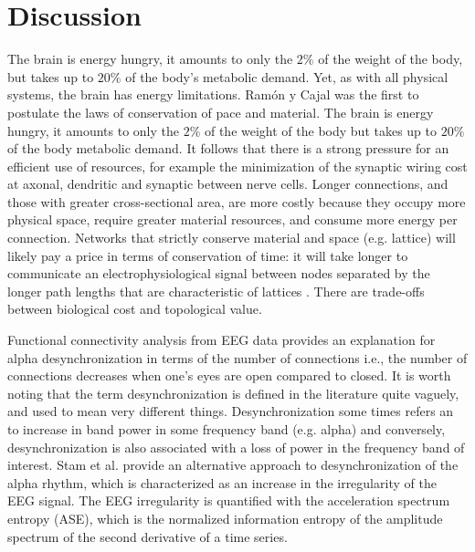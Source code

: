 \documentclass[11pt, onecolumn]{article}
\begin{document}
{\section{Discussion}

The  brain  is energy  hungry,  it  amounts  to  only the  $2\%$ of the  weight  of the  body,  but  takes  up  to  $20\%$ of the  body's  metabolic demand. Yet, as with all physical systems, the brain has energy limitations. Ram{\'o}n y Cajal was the first to postulate the laws of conservation of pace and material. The brain is energy hungry, it amounts to only the $2\%$ of the weight of the body but takes up to $20\%$ of the body metabolic demand. It follows that there is a strong pressure for an efficient use of resources, for example the minimization of the synaptic wiring cost at axonal, dendritic and synaptic between nerve cells.
Longer connections, and those with greater cross-sectional area, are more costly because they occupy more physical space, require greater material resources, and consume more energy per connection. Networks that strictly conserve material and space (e.g. lattice) will likely pay a price in terms of conservation of time: it will take longer to communicate an electrophysiological signal between nodes separated by the longer path lengths that are characteristic of lattices \citep{fornito2016fundamentals}. There are trade-offs between biological cost and topological value.

Functional connectivity analysis from EEG data provides an explanation for alpha desynchronization in terms of the number of connections i.e.,  the number of connections decreases when one's eyes are open compared to closed. It is worth noting that the term desynchronization is defined in the literature quite vaguely, and used to mean very different things. Desynchronization some times refers an to increase in band power in some frequency band (e.g. alpha) and conversely, desynchronization is also associated with a loss of power in the frequency band of interest. 
Stam et al.\citep{stam1993quantification} provide an alternative approach to desynchronization of the alpha rhythm, which is characterized as an increase in the irregularity of the EEG signal. The EEG irregularity is quantified with the acceleration spectrum entropy (ASE), which is the normalized information entropy of the amplitude spectrum of the second derivative of a time series.

}
\end{document}
